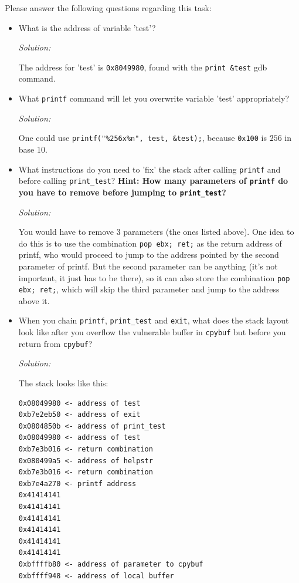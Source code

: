 \documentclass[a4paper,11pt]{article}
\newenvironment{solution}%
{\par{\noindent\small\textit{Solution:}}\vspace{-12pt}\begin{framed}}%
{\end{framed}\par}
\begin{document}
\noindent Please answer the following questions regarding this task:

\begin{itemize}
\item What is the address of variable 'test'?
\ifsolution\begin{solution}
The address for 'test' is \texttt{0x8049980}, found with the \texttt{print \&test} gdb command.
\end{solution}\fi
\item What \texttt{printf} command will let you overwrite variable 'test'
  appropriately?
\ifsolution\begin{solution}
One could use \texttt{printf("\%256x\%n", test, \&test);}, because \texttt{0x100} is $256$ in base 10.
\end{solution}\fi
\item What instructions do you need to 'fix' the stack after calling
  \texttt{printf} and before calling \texttt{print\_test}? \textbf{Hint: How
    many parameters of \texttt{printf} do you have to remove before jumping to \texttt{print\_test}?}
\ifsolution\begin{solution}
You would have to remove 3 parameters (the ones listed above). One idea to do this is to use the combination
\texttt{pop ebx; ret;} as the return address of printf, who would proceed to jump to the address pointed
by the second parameter of printf. But the second parameter can be anything (it's not important, it just
has to be there), so it can also store the combination \texttt{pop ebx; ret;}, which will skip the third parameter
and jump to the address above it.
\end{solution}\fi
\item When you chain \texttt{printf}, \texttt{print\_test} and \texttt{exit}, what does the stack
  layout look like after you overflow the vulnerable buffer in \texttt{cpybuf}
  but before you return from \texttt{cpybuf}?
\ifsolution\begin{solution}
The stack looks like this:
\begin{lstlisting}
0x08049980 <- address of test
0xb7e2eb50 <- address of exit
0x0804850b <- address of print_test
0x08049980 <- address of test
0xb7e3b016 <- return combination
0x080499a5 <- address of helpstr
0xb7e3b016 <- return combination
0xb7e4a270 <- printf address
0x41414141
0x41414141
0x41414141
0x41414141
0x41414141
0x41414141
0xbffffb80 <- address of parameter to cpybuf
0xbffff948 <- address of local buffer
\end{lstlisting}


\end{solution}
\end{itemize}
\end{document}
